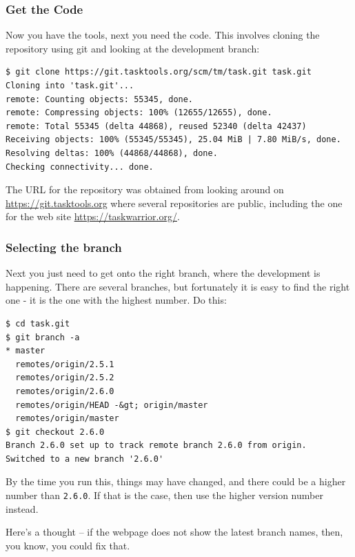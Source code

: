 \documentclass[t,handout]{beamer}
\begin{document}
\begin{frame}[fragile]\frametitle{Get the Code}
    \vfill
    Now you have the tools, next you need the code. This involves cloning the repository using git and looking at the development branch:
    \begin{lstlisting}
$ git clone https://git.tasktools.org/scm/tm/task.git task.git
Cloning into 'task.git'...
remote: Counting objects: 55345, done.
remote: Compressing objects: 100% (12655/12655), done.
remote: Total 55345 (delta 44868), reused 52340 (delta 42437)
Receiving objects: 100% (55345/55345), 25.04 MiB | 7.80 MiB/s, done.
Resolving deltas: 100% (44868/44868), done.
Checking connectivity... done.\end{lstlisting}

    The URL for the repository was obtained from looking around on \href{https://git.tasktools.org}{https://git.tasktools.org}    where several repositories are public, including the one for the web site \href{https://taskwarrior.org/}{https://taskwarrior.org/}.
\end{frame}

\begin{frame}[fragile]\frametitle{Selecting the branch}
    Next you just need to get onto the right branch, where the development is happening. There are several branches, but fortunately it is easy to find the right one - it is the one with the highest number. Do this:

\begin{lstlisting}
$ cd task.git
$ git branch -a
* master
  remotes/origin/2.5.1
  remotes/origin/2.5.2
  remotes/origin/2.6.0
  remotes/origin/HEAD -&gt; origin/master
  remotes/origin/master
$ git checkout 2.6.0
Branch 2.6.0 set up to track remote branch 2.6.0 from origin.
Switched to a new branch '2.6.0'\end{lstlisting}

    By the time you run this, things may have changed, and there could be a higher number than \verb=2.6.0=. If that is the case, then use the higher version number instead.

    Here's a thought -- if the webpage does not show the latest branch names, then, you know, you could fix that.
\end{frame}
\end{document}
